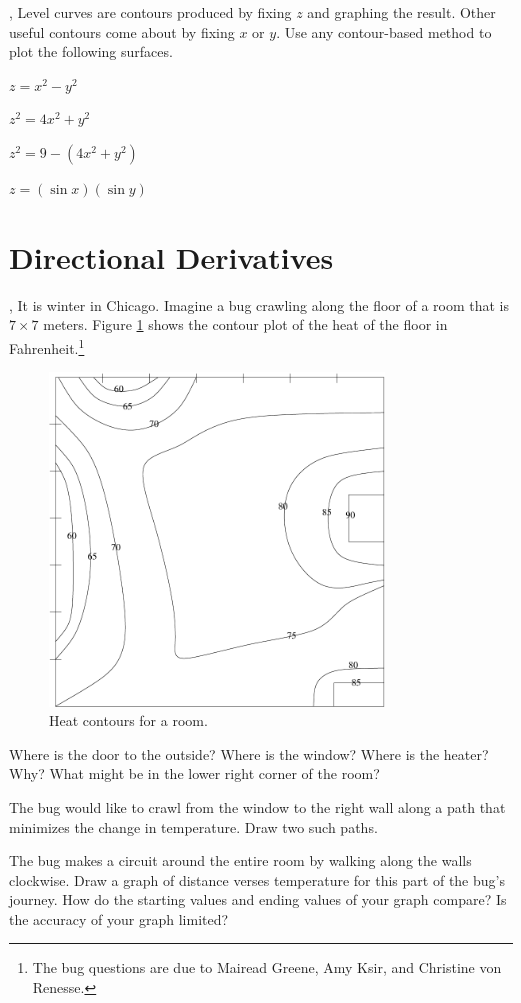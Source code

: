 \documentclass[letter]{article}
\begin{document}
	\sep
	Level curves are contours produced by fixing $z$ and graphing the result.  Other useful contours
	come about by fixing $x$ or $y$.  Use any contour-based method to plot the following surfaces.
	\begin{Enum}
		\item $z=x^2-y^2$
		\item $z^2=4x^2+y^2$
		\item $z^2=9-(4x^2+y^2)$
		\item $z=(\sin x)(\sin y)$
	\end{Enum}

\newpage
\section*{Directional Derivatives}

	\sep
	It is winter in Chicago.  Imagine a bug crawling along the floor of
	a room that is $7\times 7$ meters.  Figure \ref{heatcontour1} shows the contour plot of the heat
	of the floor in Fahrenheit.\footnote{The bug questions are due to Mairead Greene, Amy Ksir, and Christine von Renesse.}
	\begin{figure}[h!]
		\begin{center}
			\includegraphics[width=3.5in]{heat_contour1.pdf}
		\end{center}
		\vspace{-.5cm}
		\caption{Heat contours for a room.}
		\label{heatcontour1}
	\end{figure}
	\begin{Enum}
		\item Where is the door to the outside?  Where is the window?  Where is the heater? Why?
			What might be in the lower right corner of the room?
		\item The bug would like to crawl from the window to the right wall along a path that minimizes
			the change in temperature.  Draw two such paths.
		\item The bug makes a circuit around the entire room by walking along the walls clockwise.
			Draw a graph of distance verses temperature for this part of the bug's journey.  How
			do the starting values and ending values of your graph compare?  Is the accuracy of your
			graph limited?
	\end{Enum}
	
\end{document}
